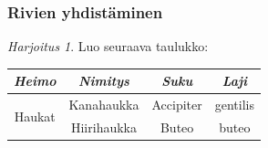 \documentclass[handout,hyperref={colorlinks=true}]{beamer}
\theoremstyle{remark}
\newtheorem{harj}{Harjoitus}[section]
\begin{document}
\begin{frame}[fragile]
    \frametitle{Rivien yhdistäminen} 
    \begin{harj}
        Luo seuraava taulukko: 
        \begin{table}\label{taulukko}
            \begin{tabular}{|c|c|c|c|}
                \hline
                \textit{Heimo} & \textit{Nimitys} & \textit{Suku} & \textit{Laji}\\ \hline
                \multirow{2}{*}{Haukat} & Kanahaukka & Accipiter &  gentilis\\ \cline{2-4}
                                        & Hiirihaukka & Buteo & buteo\\ \hline
            \end{tabular}
        \end{table}
    \end{harj}
\end{frame}
\end{document}

